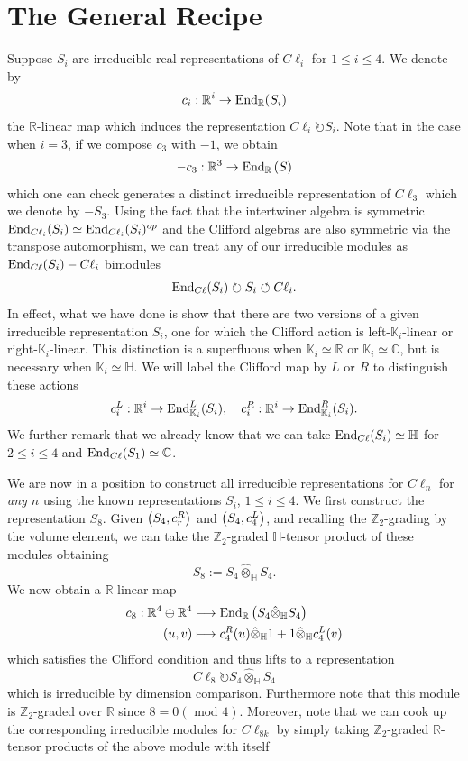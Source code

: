 \documentclass[openany, 11pt]{article}
\theoremstyle{definition}
\theoremstyle{remark}
\def\lp{\ensuremath{\left(}}
\def\rp{\ensuremath{\right)}}
\def\bC{\ensuremath{\mathbb{C}}}
\def\bH{\ensuremath{\mathbb{H}}}
\def\bR{\ensuremath{\mathbb{R}}}
\def\bZ{\ensuremath{\mathbb{Z}}}
\def\bK{\ensuremath{\mathbb{K}}}
\def\End{\ensuremath{\textnormal{End}}}
\begin{document}
\section{The General Recipe}
Suppose $S_i$ are irreducible real representations of $C\ell_i$ for $1\leq i\leq 4$. We denote by 
\[
    c_i:\bR^i\rightarrow \End_{\bR}(S_i)
\]
the $\bR$-linear map which induces the representation $C\ell_i\circlearrowright S_i$. Note that in the case when $i=3$, if we compose $c_3$ with $-1$, we obtain
\[
    -c_3:\bR^3\rightarrow\End_{\bR}\lp S\rp
\]
which one can check generates a distinct irreducible representation of $C\ell_3$ which we denote by $-S_3$. Using the fact that the intertwiner algebra is symmetric $\End_{C\ell_i}(S_i)\simeq\End_{C\ell_i}(S_i)^{op}$ and the Clifford algebras are also symmetric via the transpose automorphism, we can treat any of our irreducible modules as $\End_{C\ell}(S_i)-C\ell_i$ bimodules
\[
    \End_{C\ell}(S_i)\circlearrowright S_i\circlearrowleft C\ell_i.
\]
In effect, what we have done is show that there are two versions of a given irreducible representation $S_i$, one for which the Clifford action is left-$\bK_i$-linear or right-$\bK_i$-linear. This distinction is a superfluous when $\bK_i\simeq\bR$ or $\bK_i\simeq\bC$, but is necessary when $\bK_i\simeq\bH$. We will label the Clifford map by $L$ or $R$ to distinguish these actions
\[
    c^L_i:\bR^i\rightarrow\End^L_{\bK_i}(S_i),\quad c^R_i:\bR^i\rightarrow\End^R_{\bK_i}(S_i).
\]
We further remark that we already know that we can take $\End_{C\ell}(S_i)\simeq \bH$ for $2\leq i\leq 4$ and $\End_{C\ell}(S_1)\simeq\bC$.\par
We are now in a position to construct all irreducible representations for $C\ell_n$ for \emph{any $n$} using the known representations $S_i$, $1\leq i\leq 4$. We first construct the representation $S_8$. Given $\lp S_4,c^R_r\rp$ and $\lp S_4,c^L_4\rp$, and recalling the $\bZ_2$-grading by the volume element, we can take the $\bZ_2$-graded $\bH$-tensor product of these modules obtaining
\[
    S_8:=S_4\hat{\otimes}_{\bH}S_4.
\]
We now obtain a $\bR$-linear map 
\begin{align*}
    c_8:\bR^4\oplus\bR^4&\longrightarrow \End_{\bR}\lp S_4\hat{\otimes}_{\bH}S_4\rp\\
    \lp u,v\rp&\longmapsto c^R_4(u)\hat{\otimes}_{\bH}1+1\hat{\otimes}_{\bH}c^L_4(v)
\end{align*}
which satisfies the Clifford condition and thus lifts to a representation 
\[
    C\ell_8\circlearrowright S_4\hat{\otimes}_{\bH}S_4
\]
which is irreducible by dimension comparison. Furthermore note that this module is $\bZ_2$-graded over $\bR$ since $8=0(\text{ mod $4$})$. Moreover, note that we can cook up the corresponding irreducible modules for $C\ell_{8k}$ by simply taking $\bZ_2$-graded $\bR$-tensor products of the above module with itself
\end{document}
